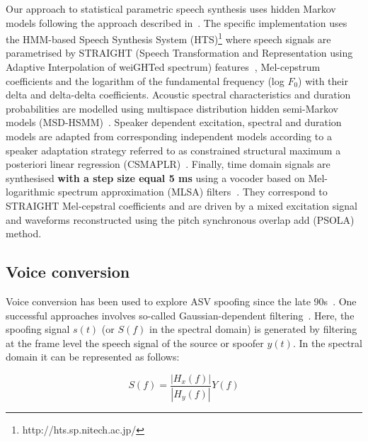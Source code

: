 Our approach to statistical parametric speech synthesis uses hidden Markov models following the approach described in~\cite{Yamagishi2009a}.  The specific implementation uses the HMM-based Speech Synthesis System (HTS)\footnote{http://hts.sp.nitech.ac.jp/} where speech signals are parametrised by STRAIGHT (Speech Transformation and Representation using Adaptive Interpolation of weiGHTed spectrum) features{\bfseries ~\cite{Kawahara2001}}, Mel-cepstrum coefficients and the logarithm of the fundamental frequency (log $F_{0}$) with their delta and delta-delta coefficients. Acoustic spectral characteristics and duration probabilities are modelled using multispace distribution hidden semi-Markov models (MSD-HSMM)~\cite{Russell1985}.  Speaker dependent  excitation, spectral and duration models are adapted from corresponding independent models according to a speaker adaptation strategy referred to as constrained structural maximum a posteriori linear regression (CSMAPLR)~\cite{Yamagishi2009a}.  Finally, time domain signals are synthesised {\bfseries with a step size equal 5 ms} using a vocoder based on Mel-logarithmic spectrum approximation (MLSA) filters{\bfseries ~\cite{Imai1983}}.  They correspond to STRAIGHT Mel-cepstral coefficients and are driven by a mixed excitation signal and waveforms reconstructed using the pitch synchronous overlap add (PSOLA) method.





\subsection{Voice conversion}
\label{ssec:vconv}


Voice conversion has been used to explore ASV spoofing since the late 90s~\cite{Pellom1999}.  One successful approaches involves so-called Gaussian-dependent filtering~\cite{Matrouf2005}. Here, the spoofing signal $s(t)$ (or $S(f)$ in the spectral domain) is generated by filtering at the frame level the speech signal of the source or spoofer $y(t)$. In the spectral domain it can be represented as follows:

\begin{equation}
S(f) = \frac{\left|H_{x}(f)\right|}{\left|H_{y}(f)\right|}Y(f)
\label{eq:conversioneq}
\end{equation}

